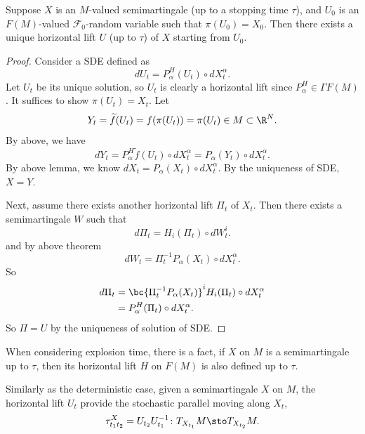 \begin{thm}
    Suppose $X$ is an $M$-valued semimartingale (up to a stopping time $\tau$), and $U_0$ is an $F(M)$-valued $\mathcal{F}_0$-random variable such that $\pi(U_0) = X_0$. Then there exists a unique horizontal lift $U$ (up to $\tau$) of $X$ starting from $U_0$.
\end{thm}
\begin{proof}
    Consider a SDE defined as
    \begin{equation*}
        dU_t = P^H_\alpha(U_t) \circ dX^\alpha_t.
    \end{equation*}
    Let $U_t$ be its unique solution, so $U_t$ is clearly a horizontal lift since $P^H_\alpha \in \Gamma{F(M)}$. It suffices to show $\pi(U_t)= X_t$. Let
    \begin{equation*}
        Y_t = \widetilde{f}(U_t) = f(\pi(U_t)) = \pi(U_t) \in M \subset \R^N.
    \end{equation*}
    By above, we have
    \begin{equation*}
        dY_t = P^H_\alpha \widetilde{f}(U_t) \circ dX^\alpha_t = P_\alpha (Y_t) \circ dX^\alpha_t.
    \end{equation*}
    By above lemma, we know $dX_t = P_\alpha (X_t) \circ dX^\alpha_t$. By the uniqueness of SDE, $X = Y$.

    Next, assume there exists another horizontal lift $\Pi_t$ of $X_t$. Then there exists a semimartingale $W$ such that 
    \begin{equation*}
        d\Pi_t = H_i(\Pi_t) \circ dW^i_t.
    \end{equation*}
    and by above theorem
    \begin{equation*}
        dW_t = \Pi_t^{-1}P_\alpha(X_t) \circ dX^\alpha_t.
    \end{equation*}
    So
    \begin{align*}
        d\Pi_t &= \bc{\Pi_t^{-1}P_\alpha(X_t)}^i H_i(\Pi_t) \circ dX^\alpha_t \\
        &= P^H_\alpha(\Pi_t) \circ dX^\alpha_t.
    \end{align*}
    So $\Pi = U$ by the uniqueness of solution of SDE. \qedhere
\end{proof}
\begin{rmk}
    When considering explosion time, there is a fact, if $X$ on $M$ is a semimartingale up to $\tau$, then its horizontal lift $H$ on $F(M)$ is also defined up to $\tau$.
\end{rmk}

Similarly as the deterministic case, given a semimartingale $X$ on $M$, the horizontal lift $U_t$ provide the stochastic parallel moving along $X_t$,
\begin{equation*}
    \tau^X_{t_1t_2} = U_{t_2}U_{t_1}^{-1} \colon T_{X_{t_1}}M \sto T_{X_{t_2}}M.
\end{equation*}

